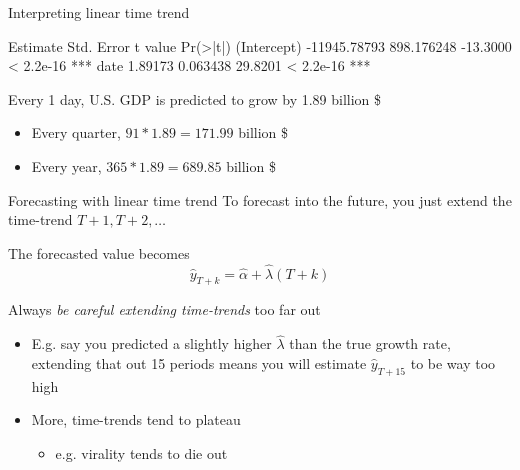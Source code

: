 \documentclass[aspectratio=169,t,11pt,table]{beamer}
\begin{document}
\begin{frame}[fragile]{Interpreting linear time trend}
  \vspace*{-\bigskipamount}
  \begin{codeblock}[{}]
                Estimate Std. Error  t value  Pr(>|t|)    
(Intercept) -11945.78793 898.176248 -13.3000 < 2.2e-16 ***
date             1.89173   0.063438  29.8201 < 2.2e-16 ***
  \end{codeblock}

  Every 1 day, U.S. GDP is predicted to grow by 1.89 billion \$ 
  \begin{itemize}
    \item Every quarter, $91 * 1.89 = 171.99$ billion \$

    \item Every year, $365 * 1.89 = 689.85$ billion \$
  \end{itemize}
\end{frame}

\begin{frame}{Forecasting with linear time trend}
  To forecast into the future, you just extend the time-trend $T+1, T+2, \dots$
  
  The forecasted value becomes 
  $$
    \hat{y}_{T+k} = \hat{\alpha} + \hat{\lambda} (T+k)
  $$

  \pause
  \bigskip
   Always \emph{be careful extending time-trends} too far out
  \begin{itemize}
    \item E.g. say you predicted a slightly higher $\hat{\lambda}$ than the true growth rate, extending that out 15 periods means you will estimate $\hat{y}_{T + 15}$ to be way too high
  
    \item More, time-trends tend to plateau 
    \begin{itemize}
      \item e.g. virality tends to die out
    \end{itemize}
  \end{itemize}
\end{frame}
\end{document}
